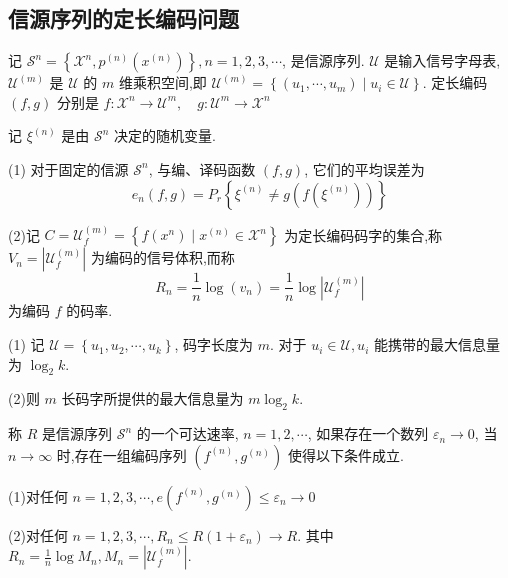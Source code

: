 \subsection{信源序列的定长编码问题}

记 $ \mathscr{S}^{n}=\left\{\mathscr{X}^{n}, p^{(n)}\left(x^{(n)}\right)\right\}, n=1,2,3, \cdots $, 是信源序列. $ \mathscr{U} $ 是输入信号字母表, $ \mathscr{U}^{(m)} $ 是 $ \mathscr{U} $ 的 $ m $ 维乘积空间,即 $ \mathscr{U}^{(m)}=\left\{\left(u_{1}, \cdots, u_{m}\right) \mid u_{i} \in \mathscr{U}\right\} $. 定长编码 $ (f, g) $ 分别是 $ f: \mathscr{X}^{n} \rightarrow \mathscr{U}^{m}, \quad g: \mathscr{U}^{m} \rightarrow \mathscr{X}^{n} $

记 $ \xi^{(n)} $ 是由 $ \mathscr{S}^{n} $ 决定的随机变量.


\begin{definition}[编码的平均误差和可达速率]
    (1) 对于固定的信源 $ \mathscr{S}^{n} $, 与编、译码函数 $ (f, g) $, 它们的平均误差为
$$
e_{n}(f, g)=P_{r}\left\{\xi^{(n)} \neq g\left(f\left(\xi^{(n)}\right)\right)\right\}
$$

(2)记 $ C=\mathscr{U}_{f}^{(m)}=\left\{f\left(x^{n}\right) \mid x^{(n)} \in \mathscr{X}^{n}\right\} $ 为定长编码码字的集合,称 $ V_{n}=\left|\mathscr{U}_{f}^{(m)}\right| $ 为编码的信号体积,而称
$$
R_{n}=\frac{1}{n} \log \left(v_{n}\right)=\frac{1}{n} \log \left|\mathscr{U}_{f}^{(m)}\right|
$$
为编码 $ f $ 的码率.
\end{definition}
\begin{remark}

    (1) 记 $ \mathscr{U}=\left\{u_{1}, u_{2}, \cdots, u_{k}\right\} $, 码字长度为 $ m $. 对于 $ u_{i} \in \mathscr{U}, u_{i} $ 能携带的最大信息量为 $ \log _{2} k $.
    
(2)则 $ m $ 长码字所提供的最大信息量为 $ m \log _{2} k $.
\end{remark}



\begin{definition}[信源序列编码的可达速率]
    称 $ R $ 是信源序列 $ \mathscr{S}^{n} $ 的一个可达速率, $ n=1,2, \cdots $, 如果存在一个数列 $ \varepsilon_{n} \rightarrow 0 $, 当 $ n \rightarrow \infty $ 时,存在一组编码序列 $ \left(f^{(n)}, g^{(n)}\right) $ 使得以下条件成立.

(1)对任何 $ n=1,2,3, \cdots, e\left(f^{(n)}, g^{(n)}\right) \leq \varepsilon_{n} \rightarrow 0 $

(2)对任何 $ n=1,2,3, \cdots, R_{n} \leq R\left(1+\varepsilon_{n}\right) \rightarrow R $. 其中 $ R_{n}=\frac{1}{n} \log M_{n}, M_{n}=\left|\mathscr{U}_{f}^{(m)}\right| $.
\end{definition}


